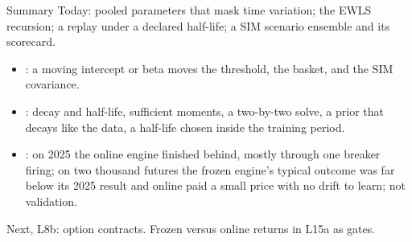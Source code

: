 \documentclass[aspectratio=169,11pt]{beamer}
\begin{document}
\begin{frame}{Summary}
  Today: pooled parameters that mask time variation; the EWLS recursion; a replay
  under a declared half-life; a SIM scenario ensemble and its scorecard.

  {\large\textbf{}}
  \begin{itemize}\setlength{\itemsep}{0.1em}
    \item {}: a moving intercept or beta moves the threshold, the
      basket, and the SIM covariance.
    \item {}: decay and half-life, sufficient moments, a two-by-two solve, a prior
      that decays like the data, a half-life chosen inside the training period.
    \item {}:
      on 2025 the online engine finished behind, mostly through one breaker firing;
      on two thousand futures the frozen engine's typical outcome was far below its
      2025 result and online paid a small price with no drift to learn; not validation.
  \end{itemize}
  Next, L8b: option contracts. Frozen versus online returns in L15a as gates.
\end{frame}

\end{document}
